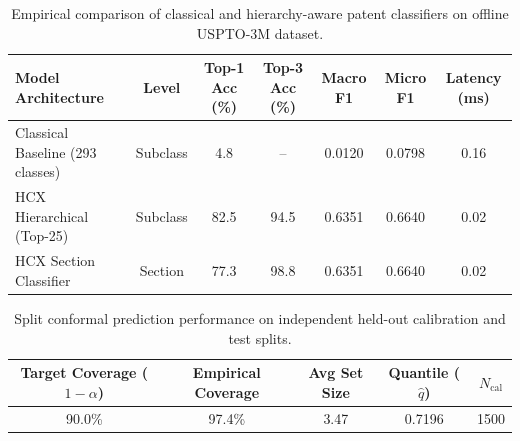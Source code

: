 
\begin{table}[t]
\centering
\caption{Empirical comparison of classical and hierarchy-aware patent classifiers on offline USPTO-3M dataset.}
\label{tab:model_comparison}
\begin{tabular}{lcccccc}
\toprule
\textbf{Model Architecture} & \textbf{Level} & \textbf{Top-1 Acc (\%)} & \textbf{Top-3 Acc (\%)} & \textbf{Macro F1} & \textbf{Micro F1} & \textbf{Latency (ms)} \\
\midrule
Classical Baseline (293 classes) & Subclass & 4.8 & -- & 0.0120 & 0.0798 & 0.16 \\
HCX Hierarchical (Top-25) & Subclass & 82.5 & 94.5 & 0.6351 & 0.6640 & 0.02 \\
HCX Section Classifier & Section & 77.3 & 98.8 & 0.6351 & 0.6640 & 0.02 \\
\bottomrule
\end{tabular}
\end{table}

\begin{table}[t]
\centering
\caption{Split conformal prediction performance on independent held-out calibration and test splits.}
\label{tab:conformal_results}
\begin{tabular}{ccccc}
\toprule
\textbf{Target Coverage ($1-\alpha$)} & \textbf{Empirical Coverage} & \textbf{Avg Set Size} & \textbf{Quantile ($\hat{q}$)} & \textbf{$N_{\text{cal}}$} \\
\midrule
90.0\% & 97.4\% & 3.47 & 0.7196 & 1500 \\
\bottomrule
\end{tabular}
\end{table}
